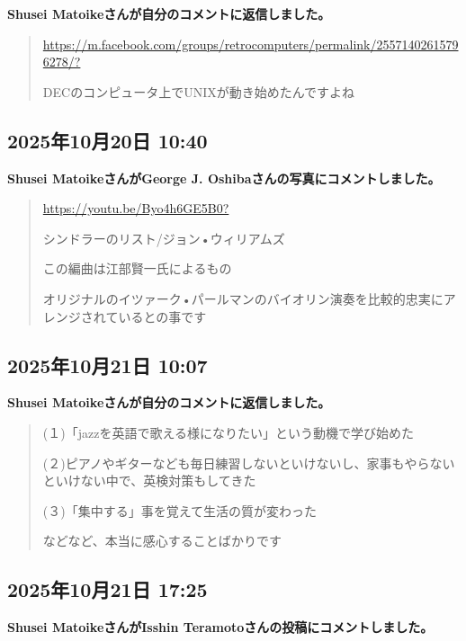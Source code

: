 \textbf{Shusei Matoikeさんが自分のコメントに返信しました。}

\begin{quote}
\url{https://m.facebook.com/groups/retrocomputers/permalink/25571402615796278/?}

DECのコンピュータ上でUNIXが動き始めたんですよね
\end{quote}

\subsection*{2025年10月20日 10:40}

\textbf{Shusei MatoikeさんがGeorge J. Oshibaさんの写真にコメントしました。}

\begin{quote}
\url{https://youtu.be/Byo4h6GE5B0?}

シンドラーのリスト/ジョン•ウィリアムズ

この編曲は江部賢一氏によるもの

オリジナルのイツァーク•パールマンのバイオリン演奏を比較的忠実にアレンジされているとの事です
\end{quote}

\subsection*{2025年10月21日 10:07}

\textbf{Shusei Matoikeさんが自分のコメントに返信しました。}

\begin{quote}
(１)「jazzを英語で歌える様になりたい」という動機で学び始めた

(２)ピアノやギターなども毎日練習しないといけないし、家事もやらないといけない中で、英検対策もしてきた

(３)「集中する」事を覚えて生活の質が変わった

などなど、本当に感心することばかりです
\end{quote}

\subsection*{2025年10月21日 17:25}

\textbf{Shusei MatoikeさんがIsshin Teramotoさんの投稿にコメントしました。}

